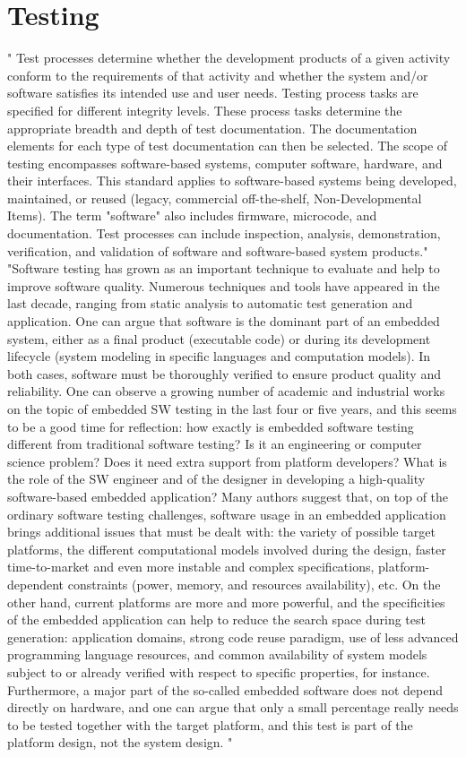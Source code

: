 \chapter{Testing}
" Test processes determine whether the development products of a given activity conform to the requirements of that activity and whether the system and/or software satisfies its intended use and user needs. Testing process tasks are specified for different integrity levels. These process tasks determine the appropriate breadth and depth of test documentation. The documentation elements for each type of test documentation can then be selected. The scope of testing encompasses software-based systems, computer software, hardware, and their interfaces. This standard applies to software-based systems being developed, maintained, or reused (legacy, commercial off-the-shelf, Non-Developmental Items). The term "software" also includes firmware, microcode, and documentation. Test processes can include inspection, analysis, demonstration, verification, and validation of software and software-based system products."\cite{ieeeTesting}
"Software testing has grown as an important technique to evaluate and help to improve software quality.
Numerous techniques and tools have appeared in the last decade, ranging from static analysis to automatic test generation and application.
One can argue that software is the dominant part of an embedded system, either as a final product (executable code) or during its development lifecycle (system modeling in specific languages and computation models).
In both cases, software must be thoroughly verified to ensure product quality and reliability.
One can observe a growing number of academic and industrial works on the topic of embedded SW testing in the last four or five years, and this seems to be a good time for reflection: how exactly is embedded software testing different from traditional software testing? 
Is it an engineering or computer science problem? 
Does it need extra support from platform developers? 
What is the role of the SW engineer and of the designer in developing a high-quality software-based embedded application?
Many authors suggest that, on top of the ordinary software testing challenges, software usage in an embedded application brings additional issues that must be dealt with: the variety of possible target platforms, the different computational models involved during the design, faster time-to-market and even more instable and complex specifications, platform-dependent constraints (power, memory, and resources availability), etc.
On the other hand, current platforms are more and more powerful, and the specificities of the embedded application can help to reduce the search space during test generation:
application domains, strong code reuse paradigm, use of less advanced programming language resources, and common availability of system models subject to or already verified with respect to specific properties, for instance.
Furthermore, a major part of the so-called embedded software does not depend directly on hardware, and one can argue that only a small percentage really needs to be tested together with the target platform, and this test is part of the platform design, not the system design. "\cite{cota}

